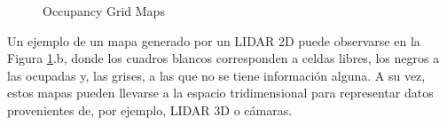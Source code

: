 \begin{figure}[!ht]
    \centering
    \qquad
    \caption{Occupancy Grid Maps}
    \label{fig:occupancygridmaps}
\end{figure}


Un ejemplo de un mapa generado por un LIDAR 2D puede observarse en la Figura \ref{fig:occupancygridmaps}.b, donde los cuadros blancos corresponden a celdas libres, los negros a las ocupadas y, las grises, a las que no se tiene información alguna. A su vez, estos mapas pueden llevarse a la espacio tridimensional para representar datos provenientes de, por ejemplo, LIDAR 3D o cámaras.

